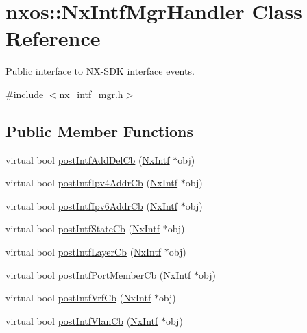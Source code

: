 \hypertarget{classnxos_1_1_nx_intf_mgr_handler}{}\section{nxos\+:\+:Nx\+Intf\+Mgr\+Handler Class Reference}
\label{classnxos_1_1_nx_intf_mgr_handler}


Public interface to N\+X-\/\+S\+DK interface events.  




{\ttfamily \#include $<$nx\+\_\+intf\+\_\+mgr.\+h$>$}

\subsection*{Public Member Functions}
\begin{DoxyCompactItemize}
\item 
virtual bool \mbox{\hyperlink{classnxos_1_1_nx_intf_mgr_handler_afe79bff5ee5b314111e2ce7c7226e73f}{post\+Intf\+Add\+Del\+Cb}} (\mbox{\hyperlink{classnxos_1_1_nx_intf}{Nx\+Intf}} $\ast$obj)
\item 
virtual bool \mbox{\hyperlink{classnxos_1_1_nx_intf_mgr_handler_a8f96e0a3a70f5f566b8f0f5928bf5e64}{post\+Intf\+Ipv4\+Addr\+Cb}} (\mbox{\hyperlink{classnxos_1_1_nx_intf}{Nx\+Intf}} $\ast$obj)
\item 
virtual bool \mbox{\hyperlink{classnxos_1_1_nx_intf_mgr_handler_ad845ed26b457bc0bdc7a9c79a94acdaf}{post\+Intf\+Ipv6\+Addr\+Cb}} (\mbox{\hyperlink{classnxos_1_1_nx_intf}{Nx\+Intf}} $\ast$obj)
\item 
virtual bool \mbox{\hyperlink{classnxos_1_1_nx_intf_mgr_handler_a9c3d4d357b1f0ab07558b4611c693755}{post\+Intf\+State\+Cb}} (\mbox{\hyperlink{classnxos_1_1_nx_intf}{Nx\+Intf}} $\ast$obj)
\item 
virtual bool \mbox{\hyperlink{classnxos_1_1_nx_intf_mgr_handler_aca73f02d8ce050cb1bb44fddc6338f76}{post\+Intf\+Layer\+Cb}} (\mbox{\hyperlink{classnxos_1_1_nx_intf}{Nx\+Intf}} $\ast$obj)
\item 
virtual bool \mbox{\hyperlink{classnxos_1_1_nx_intf_mgr_handler_ae3a76ba4fb97b941d9f11e9210d89a94}{post\+Intf\+Port\+Member\+Cb}} (\mbox{\hyperlink{classnxos_1_1_nx_intf}{Nx\+Intf}} $\ast$obj)
\item 
virtual bool \mbox{\hyperlink{classnxos_1_1_nx_intf_mgr_handler_aa6f8bc5b1cfa6d99e863c8ede3cafa5f}{post\+Intf\+Vrf\+Cb}} (\mbox{\hyperlink{classnxos_1_1_nx_intf}{Nx\+Intf}} $\ast$obj)
\item 
virtual bool \mbox{\hyperlink{classnxos_1_1_nx_intf_mgr_handler_aad14cab2e803ceadef82870303db526c}{post\+Intf\+Vlan\+Cb}} (\mbox{\hyperlink{classnxos_1_1_nx_intf}{Nx\+Intf}} $\ast$obj)
\end{DoxyCompactItemize}


